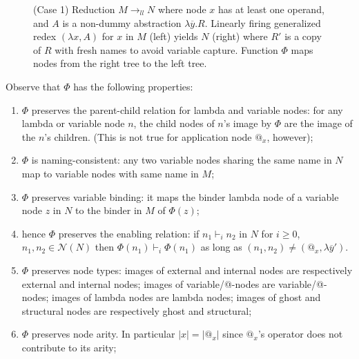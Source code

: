 \documentclass{elsarticle}
\theoremstyle{plain}
\theoremstyle{definition}
\theoremstyle{remark}
\newcommand\Nodes{\mathcal{N}}%
\newcommand{\enables}{\vdash} %
\newcommand{\llred}{\rightarrow_{ll}}
\begin{document}
\begin{description}[itemindent=0em,leftmargin=0cm]
\begin{figure}[htbp]
    \caption{(Case 1) Reduction $M\llred N$ where node $x$ has at least one operand, and $A$ is a non-dummy
     abstraction $\lambda\overline{y} . R$. Linearly firing  generalized redex $(\lambda x, A)$ for $x$ in $M$ (left)
     yields $N$ (right) where $R'$ is a copy of $R$ with fresh names to avoid variable capture.
    Function $\Phi$ maps nodes from the right tree to the left tree.}
    \label{fig:firing_genredex_effect_on_tree_with_operands_and_lambda_argument}
    \end{figure}


Observe that $\Phi$ has the following properties:
\begin{enumerate}[label=(\roman*)]
    \item $\Phi$ preserves the parent-child relation for lambda and variable nodes: for any lambda or variable node $n$, the child nodes of $n$'s image by $\Phi$ are the image of the $n$'s children. (This is not true for application node $@_x$, however);

    \item $\Phi$ is naming-consistent: any two variable nodes sharing the same name  in $N$ map to variable nodes with same name in $M$;

    \item $\Phi$ preserves variable binding: it maps the binder lambda node of a variable node $z$ in $N$ to the binder in $M$ of $\Phi(z)$;

    \item hence $\Phi$ preserves the enabling relation: if $n_1 \enables_i n_2$ in $N$ for $i\geq 0$, $n_1,n_2 \in \Nodes(N)$ then $\Phi(n_1) \enables_i \Phi(n_1)$ as long as $(n_1,n_2) \neq (@_x,\lambda\overline{y}')$.

    \item $\Phi$ preserves node types: images of external and internal nodes are respectively external and internal nodes; images of variable/@-nodes are variable/@-nodes; images of lambda nodes are lambda nodes; images of ghost and structural nodes are respectively ghost and structural;

    \item $\Phi$ preserves node arity. In particular $|x| = |@_x|$ since $@_x$'s operator does not contribute to its arity;


\end{enumerate}
\end{description}
\end{document}
